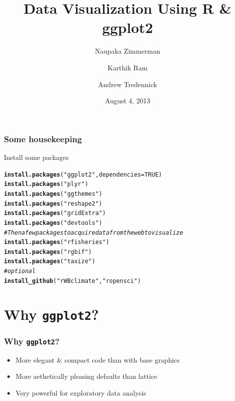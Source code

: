 \documentclass{beamer}\usepackage[]{graphicx}\usepackage[]{color}
\makeatletter
\newcommand{\hlstr}[1]{\textcolor[rgb]{0.192,0.494,0.8}{#1}}%
\newcommand{\hlcom}[1]{\textcolor[rgb]{0.678,0.584,0.686}{\textit{#1}}}%
\newcommand{\hlkwd}[1]{\textcolor[rgb]{0.737,0.353,0.396}{\textbf{#1}}}%
\newenvironment{kframe}{%
 \def\at@end@of@kframe{}%
 \ifinner\ifhmode%
  \def\at@end@of@kframe{\end{minipage}}%
  \begin{minipage}{\columnwidth}%
 \fi\fi%
 \def\FrameCommand##1{\hskip\@totalleftmargin \hskip-\fboxsep
 \colorbox{shadecolor}{##1}\hskip-\fboxsep
     \hskip-\linewidth \hskip-\@totalleftmargin \hskip\columnwidth}%
 \MakeFramed {\advance\hsize-\width
   \@totalleftmargin\z@ \linewidth\hsize
   \@setminipage}}%
 {\par\unskip\endMakeFramed%
 \at@end@of@kframe}
\newenvironment{knitrout}{}{} %
\makeatother
\begin{document}


\title{Data Visualization Using R \& ggplot2}
\author{Naupaka Zimmerman \and Karthik Ram \and Andrew Tredennick}
\date{August 4, 2013}
\maketitle


\begin{frame}[fragile]
\frametitle{Some housekeeping}
Install some packages
\begin{knitrout}\footnotesize
{}\color{fgcolor}\begin{kframe}
\begin{alltt}
\hlkwd{install.packages}(\hlstr{"ggplot2"}, dependencies = TRUE)
\hlkwd{install.packages}(\hlstr{"plyr"})
\hlkwd{install.packages}(\hlstr{"ggthemes"})
\hlkwd{install.packages}(\hlstr{"reshape2"})
\hlkwd{install.packages}(\hlstr{"gridExtra"})
\hlkwd{install.packages}(\hlstr{"devtools"})
\hlcom{# Then a few packages to acquire data from the web to visualize}
\hlkwd{install.packages}(\hlstr{"rfisheries"})
\hlkwd{install.packages}(\hlstr{"rgbif"})
\hlkwd{install.packages}(\hlstr{"taxize"})
\hlcom{# optional}
\hlkwd{install_github}(\hlstr{"rWBclimate"}, \hlstr{"ropensci"})
\end{alltt}
\end{kframe}
\end{knitrout}

\end{frame}


\section*{Why \texttt{ggplot2}?}
\frame{\sectionpage}


\begin{frame}[fragile]
\frametitle{Why \texttt{ggplot2}?}
\begin{itemize}
\item More elegant \& compact code than with base graphics\\
\item More aethetically pleasing defaults than lattice\\
\item Very powerful for exploratory data analysis\\
\end{itemize}
\end{frame}
\end{document}
